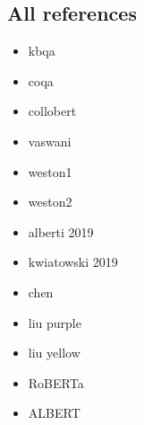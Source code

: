 \documentclass[10pt,hidelinks]{article}
\begin{document}
\subsection{All references}

\begin{itemize}
  \item kbqa~\cite{kbqa}    
  \item coqa~\cite{coqa}
  \item collobert~\cite{Collobert}
  \item vaswani~\cite{vaswani}
  \item weston1~\cite{weston-tracking}
  \item weston2~\cite{weston-reading}
  \item alberti 2019~\cite{alberti}
  \item kwiatowski 2019~\cite{kwiatowski}
  \item chen~\cite{chen}
  \item liu purple~\cite{liu-purple}
  \item liu yellow~\cite{liu-yellow}
  \item RoBERTa~\cite{roberta}
  \item ALBERT~\cite{albert}
\end{itemize}




\end{document}
